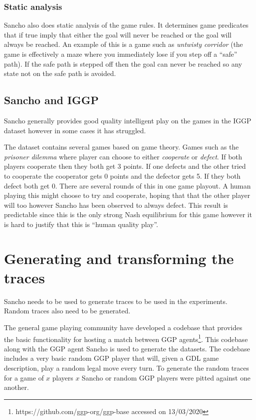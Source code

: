 \subsubsection{Static analysis}

Sancho also does static analysis of the game rules. It determines game predicates that if true imply that either the goal will never be reached or the goal will always be reached. An example of this is a game such as \textit{untwisty corridor} (the game is effectively a maze where you immediately lose if you step off a ``safe'' path). If the safe path is stepped off then the goal can never be reached so any state not on the safe path is avoided.

\subsection{Sancho and IGGP}
Sancho generally provides good quality intelligent play on the games in the IGGP dataset however in some cases it has struggled.

The dataset contains several games based on game theory. Games such as the \textit{prisoner dilemma} where player can choose to either \textit{cooperate} or \textit{defect}. If both players cooperate then they both get 3 points. If one defects and the other tried to cooperate the cooperator gets 0 points and the defector gets 5. If they both defect both get 0. There are several rounds of this in one game playout. A human playing this might choose to try and cooperate, hoping that that the other player will too however Sancho has been observed to always defect. This result is predictable since this is the only strong Nash equilibrium for this game however it is hard to justify that this is ``human quality play''.


\section{Generating and transforming the traces}\label{sec:gen}
Sancho needs to be used to generate traces to be used in the experiments. Random traces also need to be generated. 

The general game playing community have developed a codebase that provides the basic functionality for hosting a match between GGP agents\footnote{https://github.com/ggp-org/ggp-base accessed on 13/03/2020}. This codebase along with the GGP agent Sancho is used to generate the datasets. The codebase includes a very basic random GGP player that will, given a GDL game description, play a random legal move every turn. To generate the random traces for a game of $x$ players $x$ Sancho or random GGP players were pitted against one another.

